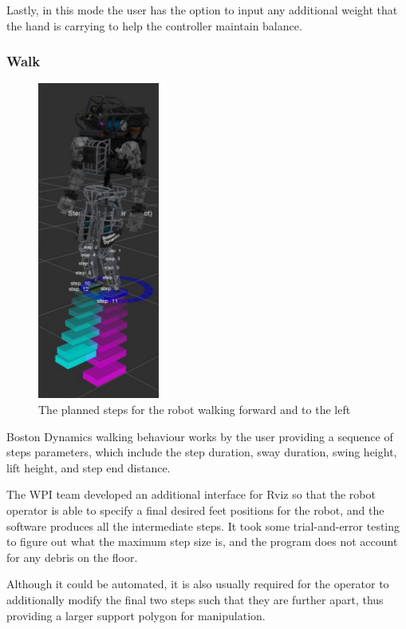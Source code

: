 \documentclass[12pt]{report}
\begin{document}
Lastly, in this mode the user has the option to input any additional weight that the hand is carrying to help the controller maintain balance.
 
\subsubsection{Walk}

\begin{figure}
  \begin{center}
    \includegraphics[scale=0.5]{images/step_gui.png}
  \end{center}
  \caption{The planned steps for the robot walking forward and to the left}
\end{figure}


Boston Dynamics walking behaviour works by the user providing a sequence of steps parameters, which include the step duration, sway duration, swing height, lift height, and step end distance.  

The WPI team developed an additional interface for Rviz so that the robot operator is able to specify a final desired feet positions for the robot, and the software produces all the intermediate steps. It took some trial-and-error testing to figure out what the maximum step size is, and the program does not account for any debris on the floor. 

Although it could be automated, it is also usually required for the operator to additionally modify the final two steps such that they are further apart, thus providing a larger support polygon for manipulation. 
\end{document}

